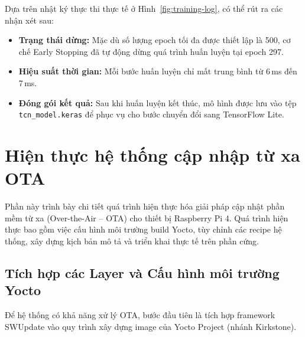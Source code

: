 Dựa trên nhật ký thực thi thực tế ở Hình~\ref{fig:training-log}, có thể rút ra các nhận xét sau:

\begin{itemize}
    \item \textbf{Trạng thái dừng:} Mặc dù số lượng epoch tối đa được thiết lập là 500, cơ chế Early Stopping đã tự động dừng quá trình huấn luyện tại epoch 297.
    
    \item \textbf{Hiệu suất thời gian:} Mỗi bước huấn luyện chỉ mất trung bình từ 6\,ms đến 7\,ms.
    
    \item \textbf{Đóng gói kết quả:} Sau khi huấn luyện kết thúc, mô hình được lưu vào tệp \texttt{tcn\_model.keras} để phục vụ cho bước chuyển đổi sang TensorFlow Lite.
\end{itemize}

\section{Hiện thực hệ thống cập nhập từ xa OTA}
Phần này trình bày chi tiết quá trình hiện thực hóa giải pháp cập nhật phần mềm từ xa (Over-the-Air -- OTA) cho thiết bị Raspberry Pi 4. Quá trình hiện thực bao gồm việc cấu hình môi trường build Yocto, tùy chỉnh các recipe hệ thống, xây dựng kịch bản mô tả và triển khai thực tế trên phần cứng.

\subsection{Tích hợp các Layer và Cấu hình môi trường Yocto}

Để hệ thống có khả năng xử lý OTA, bước đầu tiên là tích hợp framework SWUpdate vào quy trình xây dựng image của Yocto Project (nhánh Kirkstone).

